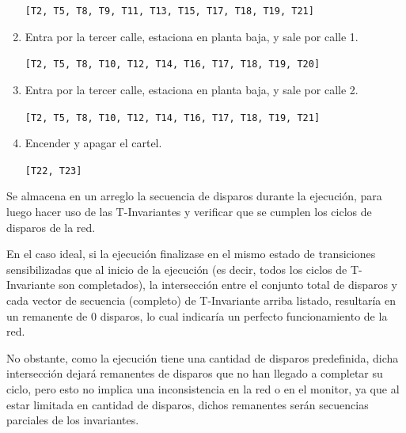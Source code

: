 \documentclass[12pt,a4paper]{article}
\begin{document}
\begin{enumerate}[leftmargin=1.5cm]
    \verb|[T2, T5, T8, T9, T11, T13, T15, T17, T18, T19, T21]|
    
    \item Entra por la tercer calle, estaciona en planta baja, y sale por calle 1.
    
    \verb|[T2, T5, T8, T10, T12, T14, T16, T17, T18, T19, T20]|
    
    \item Entra por la tercer calle, estaciona en planta baja, y sale por calle 2.
    
    \verb|[T2, T5, T8, T10, T12, T14, T16, T17, T18, T19, T21]|
    
    \item Encender y apagar el cartel.
    
    \verb|[T22, T23]|
\end{enumerate}

Se almacena en un arreglo la secuencia de disparos durante la ejecución, para luego hacer uso de las T-Invariantes y verificar que se cumplen los ciclos de disparos de la red. 

En el caso ideal, si la ejecución finalizase en el mismo estado de transiciones sensibilizadas que al inicio de la ejecución (es decir, todos los ciclos de T-Invariante son completados), la intersección entre el conjunto total de disparos y cada vector de secuencia (completo) de T-Invariante arriba listado, resultaría en un remanente de 0 disparos, lo cual indicaría un perfecto funcionamiento de la red.

No obstante, como la ejecución tiene una cantidad de disparos predefinida, dicha intersección dejará remanentes de disparos que no han llegado a completar su ciclo, pero esto no implica una inconsistencia en la red o en el monitor, ya que al estar limitada en cantidad de disparos, dichos remanentes serán secuencias parciales de los invariantes.
\end{document}
